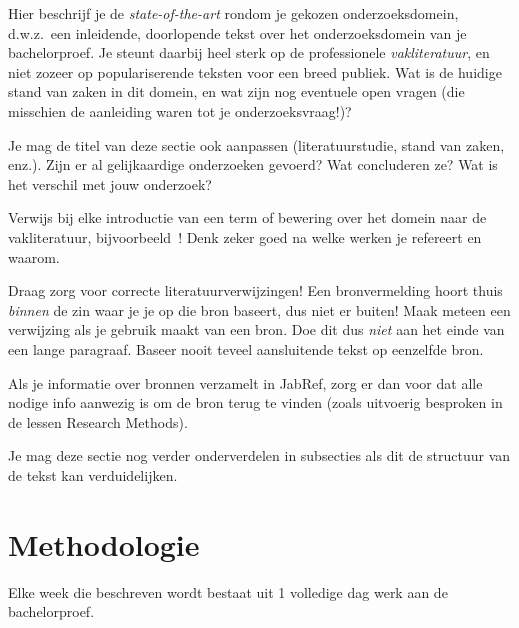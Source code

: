 Hier beschrijf je de \emph{state-of-the-art} rondom je gekozen onderzoeksdomein, d.w.z.\ een inleidende, doorlopende tekst over het onderzoeksdomein van je bachelorproef. Je steunt daarbij heel sterk op de professionele \emph{vakliteratuur}, en niet zozeer op populariserende teksten voor een breed publiek. Wat is de huidige stand van zaken in dit domein, en wat zijn nog eventuele open vragen (die misschien de aanleiding waren tot je onderzoeksvraag!)?

Je mag de titel van deze sectie ook aanpassen (literatuurstudie, stand van zaken, enz.). Zijn er al gelijkaardige onderzoeken gevoerd? Wat concluderen ze? Wat is het verschil met jouw onderzoek?

Verwijs bij elke introductie van een term of bewering over het domein naar de vakliteratuur, bijvoorbeeld~\autocite{Hykes2013}! Denk zeker goed na welke werken je refereert en waarom.

Draag zorg voor correcte literatuurverwijzingen! Een bronvermelding hoort thuis \emph{binnen} de zin waar je je op die bron baseert, dus niet er buiten! Maak meteen een verwijzing als je gebruik maakt van een bron. Doe dit dus \emph{niet} aan het einde van een lange paragraaf. Baseer nooit teveel aansluitende tekst op eenzelfde bron.

Als je informatie over bronnen verzamelt in JabRef, zorg er dan voor dat alle nodige info aanwezig is om de bron terug te vinden (zoals uitvoerig besproken in de lessen Research Methods).


Je mag deze sectie nog verder onderverdelen in subsecties als dit de structuur van de tekst kan verduidelijken.

\section{Methodologie}%
\label{sec:methodologie}

Elke week die beschreven wordt bestaat uit 1 volledige dag werk aan de bachelorproef.
